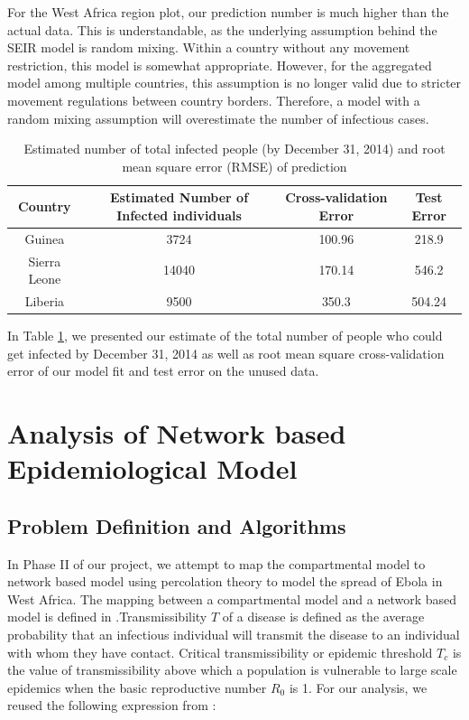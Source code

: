 \documentclass[10pt, journal,onecolumn]{IEEEtran}
\begin{document}
For the West Africa region plot, our prediction number is much higher than the actual data. This is
understandable, as the underlying assumption behind the SEIR model is random mixing.  Within a
country without any movement restriction, this model is somewhat appropriate. However, for the
aggregated model among multiple countries, this assumption is no longer valid due to stricter
movement regulations between country borders. Therefore, a model with a random mixing assumption
will overestimate the number of infectious cases.


\begin{table}[h]
\caption{Estimated number of total infected people (by December 31, 2014) and root mean square error (RMSE) of prediction}
\centering
\begin{tabular}{|c|c|c|c|}
\hline
Country & Estimated Number of Infected individuals & Cross-validation Error & Test Error
\tabularnewline
\hline
\hline
Guinea & 3724 & 100.96 & 218.9\tabularnewline
\hline
Sierra Leone & 14040 & 170.14 & 546.2\tabularnewline
\hline
Liberia & 9500 & 350.3 & 504.24\tabularnewline
\hline
\end{tabular}
\label{Tb:prediction}

\end{table}

In Table \ref{Tb:prediction}, we presented our estimate of the total number of people who could get
infected by December 31, 2014 as well as root mean square cross-validation error of our model fit
and test error on the unused data.


\section{Analysis of Network based Epidemiological Model} \label{sec:NetworkModel}


\subsection{{Problem Definition and Algorithms}}

In Phase II of our project, we attempt  to map the compartmental model to network based model  using
percolation theory to model the spread of Ebola in West Africa. The mapping between a compartmental
model and a network based model is defined in \citep{meyers2005network}.Transmissibility $T$ of a
disease is defined as the average probability that an infectious individual will transmit the
disease to an individual with whom they have contact. Critical transmissibility or epidemic
threshold $T_c$ is the value of transmissibility above which a population is vulnerable to large
scale  epidemics when the basic reproductive number $R_0$ is 1. For our analysis, we reused the
following expression from \citep{meyers2005network}:
\end{document}
